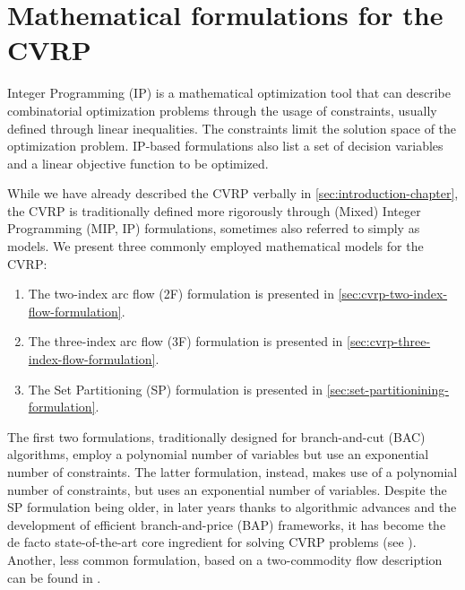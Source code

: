 \chapter{Mathematical formulations for the CVRP}
\label{sec:cvrp-mathematical-formulations}

Integer Programming (IP) is a mathematical optimization tool
that can describe combinatorial optimization problems
through the usage of constraints, usually defined through linear inequalities.
The constraints limit the solution space of the optimization problem.
IP-based formulations also list a set of decision variables and a linear objective function to be optimized.

\medskip

While we have already described the CVRP verbally in \cref{sec:introduction-chapter},
the CVRP is traditionally defined more rigorously through
(Mixed) Integer Programming (MIP, IP) formulations,
sometimes also referred to simply as models.
We present three commonly employed mathematical models for the CVRP:

\begin{enumerate}
	\setlength{\itemsep}{0pt}
	\setlength{\parskip}{0pt}

	\item The two-index arc flow (2F) formulation \parencite{laporte1983, laporte1985, laporte1986}
	      is presented in \cref{sec:cvrp-two-index-flow-formulation}.
	\item The three-index arc flow (3F) formulation \parencite{golden1977}
	      is presented in \cref{sec:cvrp-three-index-flow-formulation}.
	\item The Set Partitioning (SP) formulation \parencite{balinski1964}
	      is presented in \cref{sec:set-partitionining-formulation}.
\end{enumerate}

The first two formulations, traditionally designed
for branch-and-cut (BAC) algorithms, employ a polynomial number of variables
but use an exponential number of constraints.
The latter formulation, instead, makes use of a polynomial number of constraints,
but uses an exponential number of variables.
Despite the SP formulation being older, in later years thanks to algorithmic advances
and the development of efficient branch-and-price (BAP) frameworks, it has become the de facto
state-of-the-art core ingredient for solving CVRP problems (see \cite{pessoa2020}).
Another, less common formulation, based on a two-commodity flow description
can be found in \textcite{baldacci2004}.

